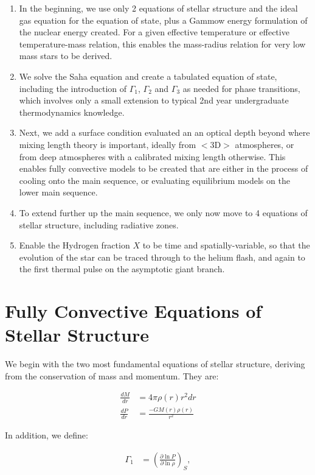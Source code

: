\documentclass[12pt]{article}
\begin{document}
\begin{enumerate}
\item In the beginning, we use only 2 equations of stellar structure and the ideal gas equation for the equation of state, plus a Gammow energy formulation of the nuclear energy created. For a given effective temperature or effective temperature-mass relation, this enables the mass-radius relation for very low mass stars to be derived.
\item We solve the Saha equation and create a tabulated equation of state, including the introduction of $\Gamma_1$, $\Gamma_2$ and $\Gamma_3$ as needed for phase transitions, which involves only a small extension to typical 2nd year undergraduate thermodynamics knowledge. 
\item Next, we add a surface condition evaluated an an optical depth beyond where mixing length theory is important, ideally from $<$3D$>$ atmospheres, or from deep atmospheres with a calibrated mixing length otherwise. This enables fully convective models to be created that are either in the process of cooling onto the main sequence, or evaluating equilibrium models on the lower main sequence. 
\item To extend further up the main sequence, we only now move to 4 equations of stellar structure, including radiative zones.
\item Enable the Hydrogen fraction $X$ to be time and spatially-variable, so that the evolution of the star can be traced through to the helium flash, and again to the first thermal pulse on the asymptotic giant branch.
\end{enumerate}

\section{Fully Convective Equations of Stellar Structure}

We begin with the two most fundamental equations of stellar structure, deriving from the conservation of mass and momentum. They are:

\begin{align}
\frac{dM}{dr} &= 4 \pi \rho(r) r^2 dr \\
\frac{dP}{dr} &= \frac{-GM(r)\rho(r)}{r^2} 
\end{align}

In addition, we define:

\begin{align}
\Gamma_1 &= \left( \frac{\partial \ln P}{\partial \ln \rho}\right)_S ,
\end{align}
\end{document}
